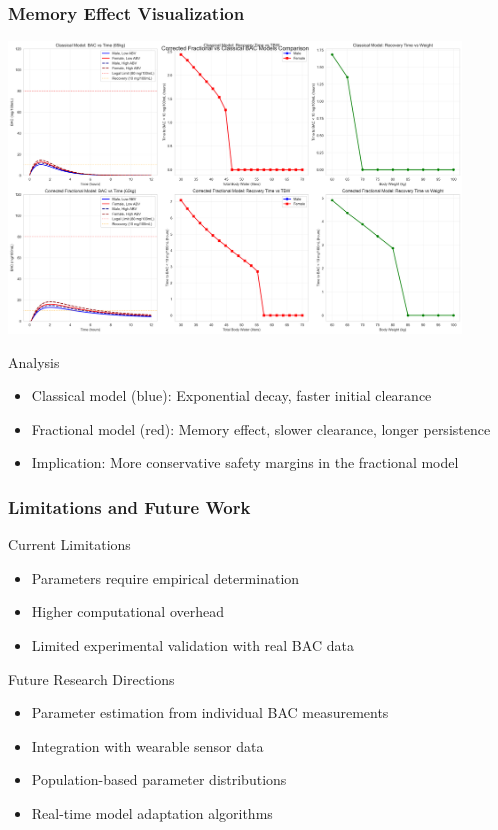 \documentclass{beamer}
\begin{document}
\begin{frame}
\frametitle{Memory Effect Visualization}
\begin{center}
\includegraphics[width=0.9\textwidth]{corrected_bac_comparison_comprehensive.png}
\end{center}

\begin{block}{Analysis}
\begin{itemize}
    \item Classical model (blue): Exponential decay, faster initial clearance
    \item Fractional model (red): Memory effect, slower clearance, longer persistence
    \item Implication: More conservative safety margins in the fractional model
\end{itemize}
\end{block}
\end{frame}

\begin{frame}
\frametitle{Limitations and Future Work}
\begin{block}{Current Limitations}
\begin{itemize}
    \item Parameters require empirical determination
    \item Higher computational overhead
    \item Limited experimental validation with real BAC data
\end{itemize}
\end{block}

\begin{block}{Future Research Directions}
\begin{itemize}
    \item Parameter estimation from individual BAC measurements
    \item Integration with wearable sensor data
    \item Population-based parameter distributions
    \item Real-time model adaptation algorithms
\end{itemize}
\end{block}
\end{frame}
\end{document}
